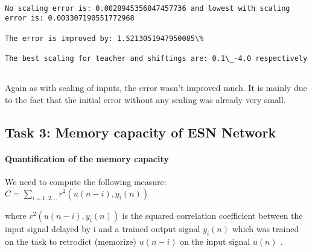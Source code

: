 \documentclass[11pt]{article}
\begin{document}
    \begin{center}
    \end{center}
    { \hspace*{\fill} \\}
    
    \begin{Verbatim}[commandchars=\\\{\}]
No scaling error is: 0.0028945356047457736 and lowest with scaling error is: 0.003307190551772968

The error is improved by: 1.5213051947950085\%

The best scaling for teacher and shiftings are: 0.1\_-4.0 respectively


    \end{Verbatim}

    Again as with scaling of inputs, the error wasn't improved much. It is
mainly due to the fact that the initial error without any scaling was
already very small.

\subsection{Task 3: Memory capacity of ESN
Network}\label{task-3-memory-capacity-of-esn-network}

    \paragraph{Quantification of the memory
capacity}\label{quantification-of-the-memory-capacity}

We need to compute the following measure:
\(C = \sum_{i=1,2,..} r^2(u(n-i),y_{i}(n))\)

where \(r^2(u(n−i),y_{i}(n))\) is the squared correlation coefficient
between the input signal delayed by i and a trained output signal
\(y_i(n)\) which was trained on the task to retrodict (memorize)
\(u(n−i)\) on the input signal \(u(n)\) .
\end{document}
